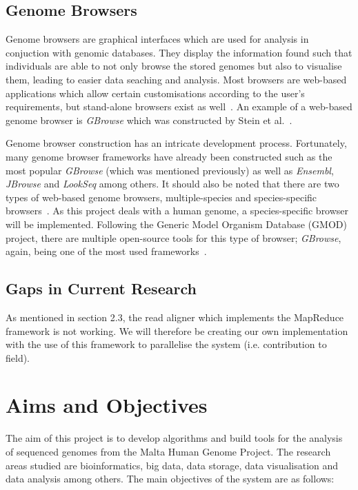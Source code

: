 \documentclass{csfyp}
\begin{document}
\subsection{Genome Browsers}\vspace{-2ex}
Genome browsers are graphical interfaces which are used for analysis in conjuction with genomic databases.  They display the information found such that individuals are able to not only browse the stored genomes but also to visualise them, leading to easier data seaching and analysis.  Most browsers are web-based applications which allow certain customisations according to the user's requirements, but stand-alone browsers exist as well~\cite{webbrowser, genericbrowser}.  An example of a web-based genome browser is {\textit{GBrowse}} which was constructed by Stein et al.~\cite{genericbrowser}. 
 
Genome browser construction has an intricate development process.  Fortunately, many genome browser frameworks have already been constructed such as the most popular {\textit{GBrowse}} (which was mentioned previously) as well as {\textit{Ensembl}}, {\textit{JBrowse}} and {\textit{LookSeq}} among others.  It should also be noted that there are two types of web-based genome browsers, multiple-species and species-specific browsers~\cite{webbrowser}.  As this project deals with a human genome, a species-specific browser will be implemented.  Following the Generic Model Organism Database (GMOD) project, there are multiple open-source tools for this type of browser; {\textit{GBrowse}}, again, being one of the most used frameworks~\cite{webbrowser}.              

\subsection{Gaps in Current Research}\vspace{-2ex}
As mentioned in section 2.3, the read aligner which implements the MapReduce framework is not working.  We will therefore be creating our own implementation with the use of this framework to parallelise the system (i.e. contribution to field).     
     

\section{Aims and Objectives}\vspace{-2ex}

The aim of this project is to develop algorithms and build tools for the analysis of sequenced genomes from the Malta Human Genome Project.  The research areas studied are bioinformatics, big data, data storage, data visualisation and data analysis among others.  The main objectives of the system are as follows:
\end{document}
